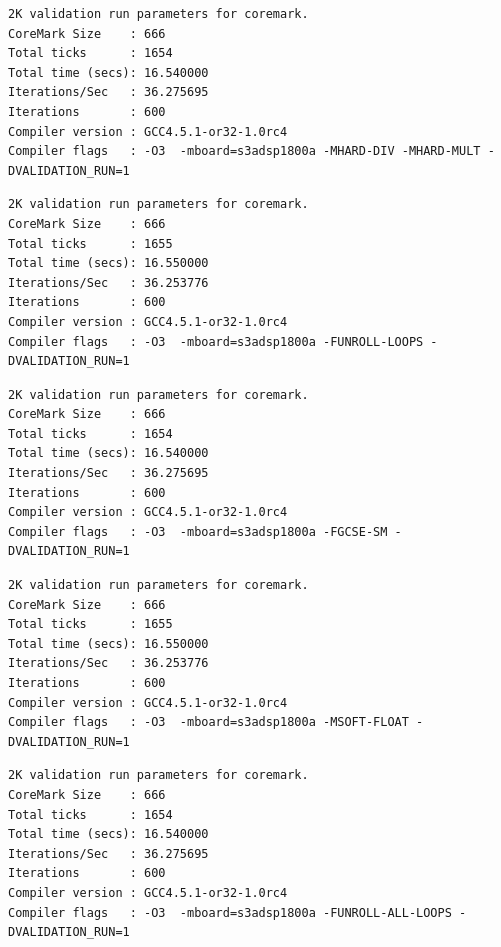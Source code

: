 \begin{lstlisting}[frame=single,caption={Optimización nivel -O3 - Flags activos -MHARD-DIV -MHARD-MULT},label={lst:salidasO2},breaklines]
2K validation run parameters for coremark.
CoreMark Size    : 666
Total ticks      : 1654
Total time (secs): 16.540000
Iterations/Sec   : 36.275695
Iterations       : 600
Compiler version : GCC4.5.1-or32-1.0rc4
Compiler flags   : -O3  -mboard=s3adsp1800a -MHARD-DIV -MHARD-MULT -DVALIDATION_RUN=1  
\end{lstlisting}

\begin{lstlisting}[frame=single,caption={Optimización nivel -O3 - Flags activos -FUNROLL-LOOPS},label={lst:salidasO2},breaklines]
2K validation run parameters for coremark.
CoreMark Size    : 666
Total ticks      : 1655
Total time (secs): 16.550000
Iterations/Sec   : 36.253776
Iterations       : 600
Compiler version : GCC4.5.1-or32-1.0rc4
Compiler flags   : -O3  -mboard=s3adsp1800a -FUNROLL-LOOPS -DVALIDATION_RUN=1  
\end{lstlisting}

\begin{lstlisting}[frame=single,caption={Optimización nivel -O3 - Flags activos -FGCSE-SM},label={lst:salidasO2},breaklines]
2K validation run parameters for coremark.
CoreMark Size    : 666
Total ticks      : 1654
Total time (secs): 16.540000
Iterations/Sec   : 36.275695
Iterations       : 600
Compiler version : GCC4.5.1-or32-1.0rc4
Compiler flags   : -O3  -mboard=s3adsp1800a -FGCSE-SM -DVALIDATION_RUN=1  
\end{lstlisting}

\begin{lstlisting}[frame=single,caption={Optimización nivel -O3 - Flags activos -MSOFT-FLOAT},label={lst:salidasO2},breaklines]
2K validation run parameters for coremark.
CoreMark Size    : 666
Total ticks      : 1655
Total time (secs): 16.550000
Iterations/Sec   : 36.253776
Iterations       : 600
Compiler version : GCC4.5.1-or32-1.0rc4
Compiler flags   : -O3  -mboard=s3adsp1800a -MSOFT-FLOAT -DVALIDATION_RUN=1  
\end{lstlisting}

\begin{lstlisting}[frame=single,caption={Optimización nivel -O3 - Flags activos -FUNROLL-ALL-LOOPS},label={lst:salidasO2},breaklines]
2K validation run parameters for coremark.
CoreMark Size    : 666
Total ticks      : 1654
Total time (secs): 16.540000
Iterations/Sec   : 36.275695
Iterations       : 600
Compiler version : GCC4.5.1-or32-1.0rc4
Compiler flags   : -O3  -mboard=s3adsp1800a -FUNROLL-ALL-LOOPS -DVALIDATION_RUN=1  
\end{lstlisting}

